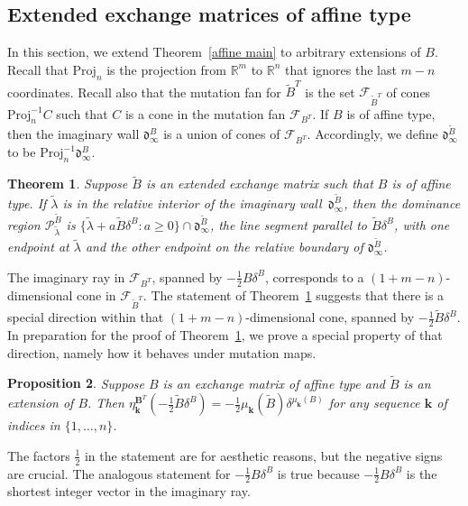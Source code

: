 \documentclass{amsart}
\newtheorem{proposition}{Proposition}[section]
\newtheorem{theorem}[proposition]{Theorem}
\theoremstyle{definition}
\theoremstyle{remark}
\numberwithin{equation}{section}
\newcommand{\reals}{\mathbb R}
\newcommand{\set}[1]{{\lbrace #1 \rbrace}}
\newcommand{\F}{{\mathcal F}}
\newcommand{\0}{{\mathbf{0}}}
\newcommand{\Proj}{\mathrm{Proj}}
\newcommand{\kk}{{\boldsymbol{k}}}
\newcommand{\tB}{{\widetilde{B}}}
\newcommand{\BB}{\mathbf{B}}
\renewcommand{\P}{\mathcal{P}}
\renewcommand{\d}{{\mathfrak d}}
\begin{document}
\subsection{Extended exchange matrices of affine type}
In this section, we extend Theorem~\ref{affine main} to arbitrary extensions of $B$.  
Recall that $\Proj_n$ is the projection from $\reals^m$ to $\reals^n$ that ignores the last $m-n$ coordinates.
Recall also that the mutation fan for $\tB^T$ is the set $\F_{\tB^T}$ of cones $\Proj_n^{-1}C$ such that $C$ is a cone in the mutation fan $\F_{B^T}$.
If $B$ is of affine type, then the imaginary wall $\d_\infty^B$ is a union of cones of $\F_{B^T}$.
Accordingly, we define $\d_\infty^\tB$ to be $\Proj_n^{-1}\d_\infty^B$.

\begin{theorem}\label{affine main extended}
Suppose $\tB$ is an extended exchange matrix such that $B$ is of affine type.
  If $\tilde\lambda$ is in the relative interior of the imaginary wall~$\d^\tB_\infty$, then the dominance region $\P^\tB_{\tilde\lambda}$ is $\set{\tilde\lambda+a\tB\delta^B:a\ge0}\cap\d^\tB_\infty$, the line segment parallel to $\tB\delta^B$, with one endpoint at $\tilde\lambda$ and the other endpoint on the relative boundary of $\d^\tB_\infty$.
\end{theorem}

The imaginary ray in $\F_{B^T}$, spanned by $-\frac12B\delta^B$, corresponds to a $(1+m-n)$-dimensional cone in $\F_{\tB^T}$.
The statement of Theorem~\ref{affine main extended} suggests that there is a special direction within that $(1+m-n)$-dimensional cone, spanned by $-\frac12\tB\delta^B$.
In preparation for the proof of Theorem~\ref{affine main extended}, we prove a special property of that direction, namely how it behaves under mutation maps.

\begin{proposition}\label{delta is the tilde man}
Suppose $B$ is an exchange matrix of affine type and $\tB$ is an extension of $B$.
Then $\eta^{\BB^T}_\kk(-\frac12\tB\delta^B)=-\frac12\mu_\kk(\tB)\delta^{\mu_\kk(B)}$ for any sequence $\kk$ of indices in $\set{1,\ldots,n}$.
\end{proposition}
The factors $\frac12$ in the statement are for aesthetic reasons, but the negative signs are crucial.
The analogous statement for $-\frac12B\delta^B$ is true because $-\frac12B\delta^B$ is the shortest integer vector in the imaginary ray.
\end{document}
